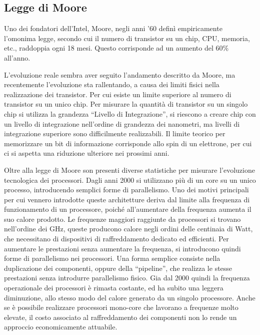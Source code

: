 \documentclass{article}
\numberwithin{equation}{subsection}
\begin{document}
\subsection{Legge di Moore}

Uno dei fondatori dell'Intel, Moore, negli anni '60 definì empiricamente l'omonima legge, secondo cui il numero di transistor su un chip, CPU, memoria, etc., raddoppia ogni 18 
mesi. Questo corrisponde ad un aumento del 60\% all'anno. 

L'evoluzione reale sembra aver seguito l'andamento descritto da Moore, ma recentemente l'evoluzione sta rallentando, a causa dei limiti fisici nella 
realizzazione dei transistor. Per cui esiste un limite superiore al numero di transistor su un unico chip. 
Per misurare la quantità di transistor su un singolo chip si utilizza la grandezza ``Livello di Integrazione'', si riescono a creare chip con un livello di 
integrazione nell'ordine di grandezza dei nanometri, ma livelli di integrazione superiore sono difficilmente realizzabili. Il limite teorico per memorizzare un bit di informazione 
corrisponde allo spin di un elettrone, per cui ci si aspetta una riduzione ulteriore nei prossimi anni. 

Oltre alla legge di Moore son presenti diverse statistiche per misurare l'evoluzione tecnologica dei processori. Dagli anni 2000 si utilizzano più di un core su un unico 
processo, introducendo semplici forme di parallelismo. Uno dei motivi principali per cui vennero introdotte queste architetture deriva dal limite alla frequenza di funzionamento 
di un processore, poiché all'aumentare della frequenza aumenta il suo calore prodotto. Le frequenze maggiori raggiunte da processori si trovano nell'ordine dei 
GHz, queste producono calore negli ordini delle centinaia di Watt, che necessitano di dispositivi di raffreddamento dedicato ed efficienti. Per aumentare le prestazioni senza aumentare la frequenza, si 
introducono quindi forme di parallelismo nei processori. Una forma semplice consiste nella duplicazione dei componenti, oppure della ``pipeline'', che realizza le stesse prestazioni senza introdurre 
parallelismo fisico. Gia dal 2000 quindi la frequenza operazionale dei processori è rimasta costante, ed ha subito una leggera diminuzione, allo stesso modo del calore generato da un singolo 
processore. Anche se è possibile realizzare processori mono-core che lavorano a frequenze molto elevate, il costo associato al raffreddamento dei componenti non lo rende un 
approccio economicamente attuabile. 
\end{document}
